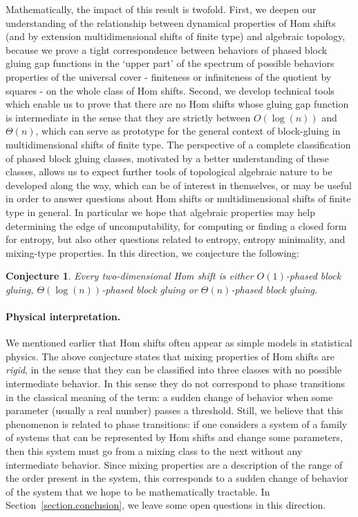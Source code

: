 \documentclass{article}
\newtheorem{conjecture}[theorem]{Conjecture}
\begin{document}
Mathematically, the impact of this result is twofold. First, we deepen our understanding of the relationship between dynamical properties of Hom shifts (and by extension multidimensional shifts of finite type) and algebraic topology, because we prove a tight correspondence between behaviors of phased block gluing gap functions in the `upper part' of the spectrum of possible behaviors properties of the universal cover - finiteness or infiniteness of the quotient by squares - on the whole class of Hom shifts. Second, we develop technical tools which enable us to prove that there are no Hom shifts whose gluing gap function is intermediate in the sense that they are strictly between $O(\log(n))$ and $\Theta(n)$, which can serve as prototype for the general context of block-gluing in multidimensional shifts of finite type. The perspective of a complete classification of phased block gluing classes, motivated by a better understanding of these classes, allows us to expect further tools of topological algebraic nature to be developed along the way, which can be of interest in themselves, or may be useful in order to answer questions about Hom shifts or multidimensional shifts of finite type in general. %
In particular we hope that algebraic properties may help determining the edge of uncomputability, for computing or finding a closed form for entropy, but also other questions related to entropy, entropy minimality, and mixing-type properties. In this direction, we conjecture the following: 

\begin{conjecture}
Every two-dimensional Hom shift is either $O(1)$-phased block gluing, $\Theta(\log(n))$-phased block gluing or $\Theta(n)$-phased block gluing.
\end{conjecture}

\paragraph*{Physical interpretation.} 
We mentioned earlier that Hom shifts often appear as simple models in statistical physics. The above conjecture states that mixing properties of Hom shifts are \emph{rigid}, in the sense that they can be classified into three classes with no possible intermediate behavior. In this sense they do not correspond to phase transitions in the classical meaning of the term: a sudden change of behavior when some parameter (usually a real number) passes a threshold. Still, we believe that this phenomenon is related to phase transitions: if one considers a system of a family of systems that can be represented by Hom shifts and change some parameters, then this system must go from a mixing class to the next without any intermediate behavior. Since mixing properties are a description of the range of the order present in the system, this corresponds to a sudden change of behavior of the system that we hope to be mathematically tractable. In Section~\ref{section.conclusion}, we leave some open questions in this direction.
\end{document}
